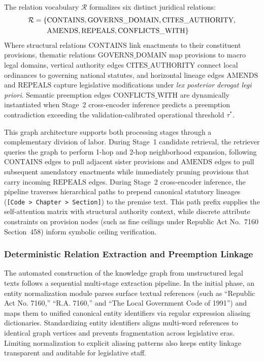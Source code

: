        The relation vocabulary $\mathcal{R}$ formalizes six distinct juridical relations:
        \begin{equation}
            \begin{aligned}
                \mathcal{R} = \{ & \text{CONTAINS}, \text{GOVERNS\_DOMAIN}, \text{CITES\_AUTHORITY}, \\
                                 & \text{AMENDS}, \text{REPEALS}, \text{CONFLICTS\_WITH} \}
            \end{aligned}
            \label{eq:relation_vocabulary}
            \eqcaption{Canonical Legal Relation Vocabulary}
        \end{equation}
        \noindent Where structural relations $\text{CONTAINS}$ link enactments to their constituent provisions, thematic relations $\text{GOVERNS\_DOMAIN}$ map provisions to macro legal domains, vertical authority edges $\text{CITES\_AUTHORITY}$ connect local ordinances to governing national statutes, and horizontal lineage edges $\text{AMENDS}$ and $\text{REPEALS}$ capture legislative modifications under \textit{lex posterior derogat legi priori}. Semantic preemption edges $\text{CONFLICTS\_WITH}$ are dynamically instantiated when Stage~2 cross-encoder inference predicts a preemption contradiction exceeding the validation-calibrated operational threshold $\tau^*$.

        This graph architecture supports both processing stages through a complementary division of labor. During Stage~1 candidate retrieval, the retriever queries the graph to perform 1-hop and 2-hop neighborhood expansion, following $\text{CONTAINS}$ edges to pull adjacent sister provisions and $\text{AMENDS}$ edges to pull subsequent amendatory enactments while immediately pruning provisions that carry incoming $\text{REPEALS}$ edges. During Stage~2 cross-encoder inference, the pipeline traverses hierarchical paths to prepend canonical statutory lineages (\texttt{[Code > Chapter > Section]}) to the premise text. This path prefix supplies the self-attention matrix with structural authority context, while discrete attribute constraints on provision nodes (such as fine ceilings under Republic Act No.~7160 Section~458) inform symbolic ceiling verification.

        \subsubsection{Deterministic Relation Extraction and Preemption Linkage}
        \label{sec:relation_extraction_lineage}
        The automated construction of the knowledge graph from unstructured legal texts follows a sequential multi-stage extraction pipeline. In the initial phase, an entity normalization module parses surface textual references (such as ``Republic Act No. 7160,'' ``R.A. 7160,'' and ``The Local Government Code of 1991'') and maps them to unified canonical entity identifiers via regular expression aliasing dictionaries. Standardizing entity identifiers aligns multi-word references to identical graph vertices and prevents fragmentation across legislative eras. Limiting normalization to explicit aliasing patterns also keeps entity linkage transparent and auditable for legislative staff.

